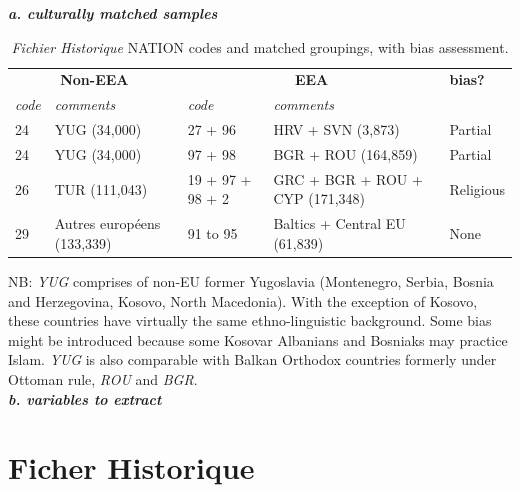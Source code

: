 \documentclass[10pt, a4paper]{article}
\begin{document}
\textbf{\textit{a. culturally matched samples}}

\begin{table}[h!]
\centering
\caption{\textit{Fichier Historique} NATION codes and matched groupings, with bias assessment.}
\begin{tabular}{ll|ll|l}
\toprule
\multicolumn{2}{c|}{\textbf{Non-EEA}} & \multicolumn{2}{c|}{\textbf{EEA}} & \textbf{bias?} \\
\textit{code} & \textit{comments} & \textit{code} & \textit{comments} & \\
\midrule
24 & YUG (34,000) & 27 + 96 & HRV + SVN (3,873) & Partial \\
24 & YUG (34,000) & 97 + 98 & BGR + ROU (164,859) & Partial \\
26 & TUR (111,043) & 19 + 97 + 98 + 2 & GRC + BGR + ROU + CYP (171,348) & Religious \\
29 & Autres européens (133,339) & 91 to 95 & Baltics + Central EU (61,839) & None \\
\bottomrule
\end{tabular}
\label{tab:nation_codes}
\end{table}
\small NB: \textit{YUG} comprises of non-EU former Yugoslavia (Montenegro, Serbia, Bosnia and Herzegovina, Kosovo, North Macedonia). With the exception of Kosovo, these countries have virtually the same ethno-linguistic background. Some bias might be introduced because some Kosovar Albanians and Bosniaks may practice Islam. \textit{YUG} is also comparable with Balkan Orthodox countries formerly under Ottoman rule, \textit{ROU} and \textit{BGR}. \\


\textbf{\textit{b. variables to extract}}
\\
\section*{Ficher Historique}
\end{document}
